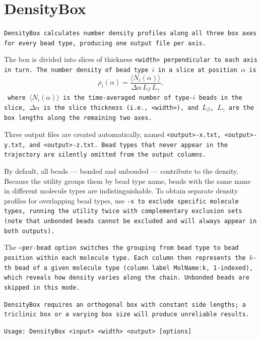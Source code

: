 \section{DensityBox} \label{sec:DensityBox}

\tt{DensityBox} calculates number density profiles along all three box axes for
every bead type, producing one output file per axis.

The box is divided into slices of thickness \tt{<width>} perpendicular to each
axis in turn. The number density of bead type $i$ in a slice at position
$\alpha$ is
\begin{equation}
  \rho_i(\alpha) = \frac{\langle N_i(\alpha) \rangle}
                   {\Delta\alpha\, L_\beta\, L_\gamma},
\end{equation}
where $\langle N_i(\alpha) \rangle$ is the time-averaged number of type-$i$ beads
in the slice, $\Delta\alpha$ is the slice thickness (i.e., \tt{<width>}), and
$L_\beta$, $L_\gamma$ are the box lengths along the remaining two axes.

Three output files are created automatically, named \tt{<output>-x.txt},
\tt{<output>-y.txt}, and \tt{<output>-z.txt}. Bead types that never appear
in the trajectory are silently omitted from the output columns.

By default, all beads --- bonded and unbonded --- contribute to the density.
Because the utility groups them by bead type name, beads with the same name
in different molecule types are indistinguishable. To obtain separate density
profiles for overlapping bead types, use \tt{-x} to exclude specific molecule
types, running the utility twice with complementary exclusion sets (note that
unbonded beads cannot be excluded and will always appear in both outputs).

The \tt{--per-bead} option switches the grouping from bead type to bead position
within each molecule type. Each column then represents the $k$-th bead of a
given molecule type (column label \tt{MolName:k}, 1-indexed), which reveals
how density varies along the chain. Unbonded beads are skipped in this mode.

\tt{DensityBox} requires an orthogonal box with constant side lengths; a
triclinic box or a varying box size will produce unreliable results.

\noindent
\tt{Usage: DensityBox <input> <width> <output> [options]}

